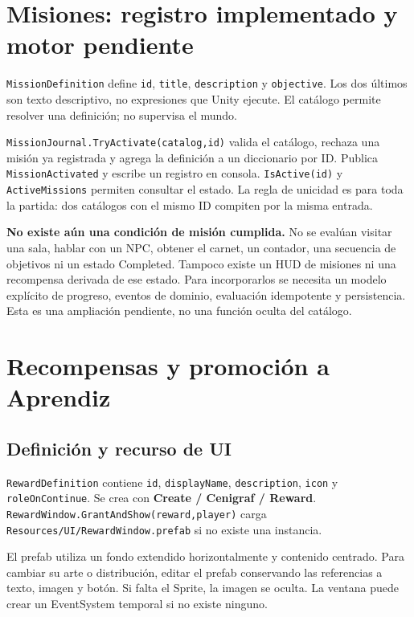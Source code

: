 \documentclass[11pt,letterpaper,oneside]{article}
\newcommand{\code}[1]{\nolinkurl{#1}}
\begin{document}
\section{Misiones: registro implementado y motor pendiente}
\code{MissionDefinition} define \code{id}, \code{title}, \code{description} y \code{objective}. Los dos últimos son texto descriptivo, no expresiones que Unity ejecute. El catálogo permite resolver una definición; no supervisa el mundo.

\code{MissionJournal.TryActivate(catalog,id)} valida el catálogo, rechaza una misión ya registrada y agrega la definición a un diccionario por ID. Publica \code{MissionActivated} y escribe un registro en consola. \code{IsActive(id)} y \code{ActiveMissions} permiten consultar el estado. La regla de unicidad es para toda la partida: dos catálogos con el mismo ID compiten por la misma entrada.

\textbf{No existe aún una condición de misión cumplida.} No se evalúan visitar una sala, hablar con un NPC, obtener el carnet, un contador, una secuencia de objetivos ni un estado Completed. Tampoco existe un HUD de misiones ni una recompensa derivada de ese estado. Para incorporarlos se necesita un modelo explícito de progreso, eventos de dominio, evaluación idempotente y persistencia. Esta es una ampliación pendiente, no una función oculta del catálogo.

\section{Recompensas y promoción a Aprendiz}
\subsection{Definición y recurso de UI}
\code{RewardDefinition} contiene \code{id}, \code{displayName}, \code{description}, \code{icon} y \code{roleOnContinue}. Se crea con \textbf{Create / Cenigraf / Reward}. \code{RewardWindow.GrantAndShow(reward,player)} carga \code{Resources/UI/RewardWindow.prefab} si no existe una instancia.

El prefab utiliza un fondo extendido horizontalmente y contenido centrado. Para cambiar su arte o distribución, editar el prefab conservando las referencias a texto, imagen y botón. Si falta el Sprite, la imagen se oculta. La ventana puede crear un EventSystem temporal si no existe ninguno.
\end{document}
